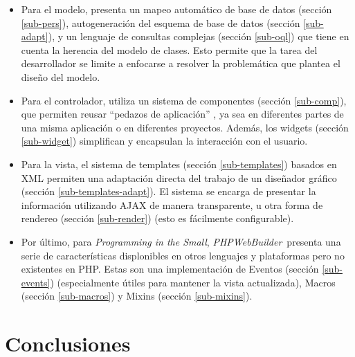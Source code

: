 \documentclass[a4paper,10pt]{article}
\newcommand{\PITS}{\emph{Programming in the Small}} %
\newcommand{\PWB}{\emph{PHPWebBuilder}}
\begin{document}
\begin{itemize}
\item Para el modelo, presenta un mapeo automático de base de datos (sección \ref{sub-pers}), autogeneración del esquema de base de datos (sección \ref{sub-adapt}), y un lenguaje de consultas complejas (sección \ref{sub-oql}) que tiene en cuenta la herencia del modelo de clases.  Esto permite que la tarea del desarrollador se limite a enfocarse a resolver la problemática que plantea el diseño del modelo.

\item Para el controlador, utiliza un sistema de componentes (sección \ref{sub-comp}), que permiten reusar ``pedazos de aplicación'' , ya sea en diferentes partes de una misma aplicación o en diferentes proyectos. Además, los widgets (sección \ref{sub-widget}) simplifican y encapsulan la interacción con el usuario.

\item Para la vista, el sistema de templates (sección \ref{sub-templates}) basados en XML permiten una adaptación directa del trabajo de un diseñador gráfico (sección \ref{sub-templates-adapt}). El sistema se encarga de presentar la información utilizando AJAX de manera transparente, u otra forma de rendereo (sección \ref{sub-render}) (esto es fácilmente configurable).

\item Por último, para \PITS, \PWB \ presenta una serie de características displonibles en otros lenguajes y plataformas pero no existentes en PHP. Estas son una implementación de Eventos (sección \ref{sub-events}) (especialmente útiles para mantener la vista actualizada),
Macros (sección \ref{sub-macros}) y Mixins (sección \ref{sub-mixins}).

\end{itemize}






\section{Conclusiones}
\end{document}
